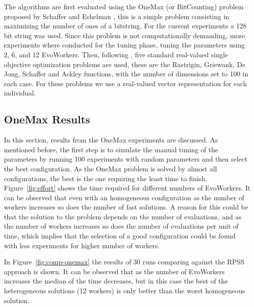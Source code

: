 \documentclass{llncs}
\begin{document}
The algorithms are first evaluated using the OneMax (or BitCounting) problem proposed by 
Schaffer and Eshelman \cite{SE91}, this is a simple problem consisting in maximizing the number 
of ones of a bitstring. For the current experiments a 128 bit string was used. Since this
problem is not computationally demanding, more experiments where conducted for the tuning phase, 
tuning the parameters using 2, 6, and 12 EvoWorkers. Then, following \cite{fuku1}, 
five standard real-valued single objective optimization problems 
are used, these are the Rastrigin, Griewank, De Jong, Schaffer  and Ackley functions, 
with the number of dimensions set to 100 in each case. For these problems we use a real-valued vector
representation for each individual.


\subsection{OneMax Results}

In this section, results from the OneMax experiments are discussed. As mentioned before, the first
step is to simulate the manual tuning of the parameters by running 100 experiments with random 
parameters and then select the best configuration. As the OneMax problem is solved by almost 
all configurations, the best is the one requiring the least time to finish. Figure~\ref{fig:effort} 
shows the time required for different numbers of EvoWorkers. It can be observed that even with an 
homogeneous configuration as the number of workers increases so does
the number of fast solutions.
A reason for this could be that the solution to the problem depends on the number of evaluations, and 
as the number of workers increases so does the number of evaluations
per unit of time, which implies
that the selection of a good configuration could be found with less experiments for higher number 
of workers.


In Figure~\ref{fig:comp-onemax} the results of 30 runs comparing
against the RPSS approach is shown. %
It can be observed that as the number of EvoWorkers increases the median of the time decreases, but
in this case the best of the heterogeneous solutions (12 workers) is only better than the worst homogeneous
solution.  %
\end{document}
